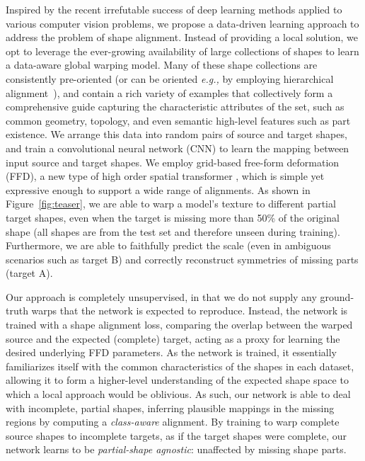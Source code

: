 \documentclass[acmtog,timestamp]{acmart}%
\begin{document}
Inspired by the recent irrefutable success of deep learning methods applied to various computer vision problems, we propose a data-driven learning approach to address the problem of  shape alignment. Instead of providing a local solution, we opt to leverage the ever-growing availability of large collections of shapes to learn a data-aware global warping model. Many of these shape collections are consistently pre-oriented (or can be oriented \emph{e.g.,} by employing hierarchical alignment~\cite{shapenet2015}), and contain a rich variety of examples that collectively form a comprehensive guide capturing the characteristic attributes of the set, such as common geometry, topology, and even semantic high-level features such as part existence.
We arrange this data into random pairs of source and target shapes, and train a convolutional neural network (CNN) to learn the mapping between input source and target shapes.
We employ grid-based free-form deformation (FFD), a new type of high order spatial transformer , which is simple yet expressive enough to support a wide range of alignments.
As shown in Figure~\ref{fig:teaser}, we are able to warp a model's texture to different partial target shapes, even when the target is missing more than 50\% of the original shape (all shapes are from the test set and therefore unseen during training). Furthermore, we are able to faithfully predict the scale (even in ambiguous scenarios such as target B) and correctly reconstruct symmetries of missing parts (target A).


Our approach is completely unsupervised, in that we do not supply any ground-truth warps that the network is expected to reproduce. Instead, the network is trained with a shape alignment loss, comparing the overlap between the warped source and the expected (complete) target, acting as a proxy for learning the desired underlying FFD parameters. As the network is trained, it essentially familiarizes itself with the common characteristics of the shapes in each dataset, allowing it to form a higher-level understanding of the expected shape space 
to which a local approach would be oblivious.
As such, our network is able to deal with incomplete, partial shapes, inferring plausible mappings in the missing regions by computing a \emph{class-aware} alignment. By training to warp complete source shapes to incomplete targets, as if the target shapes were complete, %
our network learns to be \emph{partial-shape agnostic}: unaffected by missing shape parts.
\end{document}
